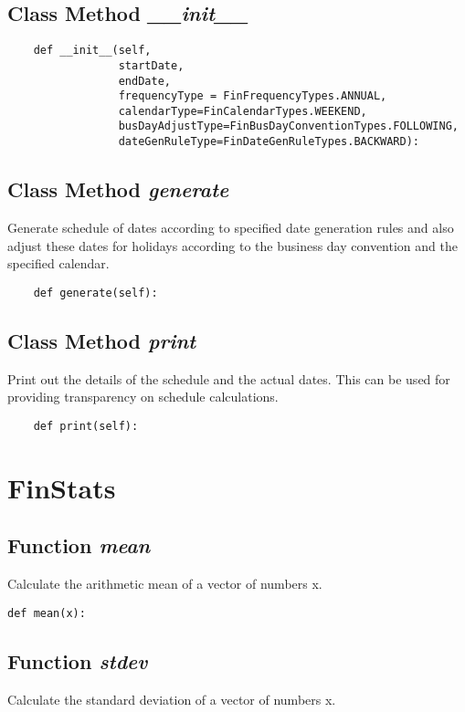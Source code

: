 \documentclass[twoside,11pt]{book}
\begin{document}
\subsection{Class Method {\it \_\_init\_\_}}


\begin{lstlisting}
    def __init__(self,
                 startDate,
                 endDate,
                 frequencyType = FinFrequencyTypes.ANNUAL,
                 calendarType=FinCalendarTypes.WEEKEND,
                 busDayAdjustType=FinBusDayConventionTypes.FOLLOWING,
                 dateGenRuleType=FinDateGenRuleTypes.BACKWARD):
\end{lstlisting}

\subsection{Class Method {\it generate}}
Generate schedule of dates according to specified date generation rules and also adjust these dates for holidays according to the business day convention and the specified calendar. 

\begin{lstlisting}
    def generate(self):
\end{lstlisting}

\subsection{Class Method {\it print}}
Print out the details of the schedule and the actual dates. This can be used for providing transparency on schedule calculations. 

\begin{lstlisting}
    def print(self):
\end{lstlisting}

\newpage
\section{FinStats}

\subsection{Function {\it mean}}
Calculate the arithmetic mean of a vector of numbers x. 

\begin{lstlisting}
def mean(x):
\end{lstlisting}

\subsection{Function {\it stdev}}
Calculate the standard deviation of a vector of numbers x. 
\end{document}
